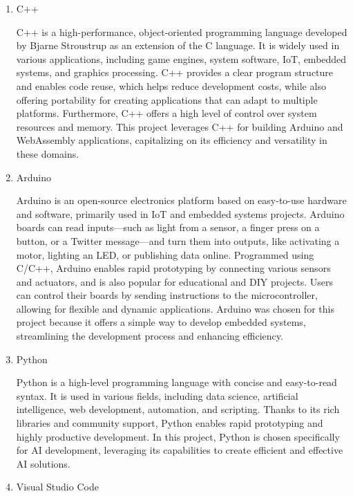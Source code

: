 \documentclass[conference]{IEEEtran}
\begin{document}
\begin{enumerate}[itemsep=2ex, parsep=1ex]
	\item C++
	      	      
	      	      
	      C++ is a high-performance, object-oriented programming language developed by Bjarne Stroustrup as an extension of the C language. It is widely used in various applications, including game engines, system software, IoT, embedded systems, and graphics processing. C++ provides a clear program structure and enables code reuse, which helps reduce development costs, while also offering portability for creating applications that can adapt to multiple platforms. Furthermore, C++ offers a high level of control over system resources and memory. This project leverages C++ for building Arduino and WebAssembly applications, capitalizing on its efficiency and versatility in these domains.
	      	      
	\item Arduino
	      	      
	      	      
	      Arduino is an open-source electronics platform based on easy-to-use hardware and software, primarily used in IoT and embedded systems projects. Arduino boards can read inputs—such as light from a sensor, a finger press on a button, or a Twitter message—and turn them into outputs, like activating a motor, lighting an LED, or publishing data online. Programmed using C/C++, Arduino enables rapid prototyping by connecting various sensors and actuators, and is also popular for educational and DIY projects. Users can control their boards by sending instructions to the microcontroller, allowing for flexible and dynamic applications. Arduino was chosen for this project because it offers a simple way to develop embedded systems, streamlining the development process and enhancing efficiency.
	      	      
	\item Python
	      	      
	      	      
	      Python is a high-level programming language with concise and easy-to-read syntax. It is used in various fields, including data science, artificial intelligence, web development, automation, and scripting. Thanks to its rich libraries and community support, Python enables rapid prototyping and highly productive development. In this project, Python is chosen specifically for AI development, leveraging its capabilities to create efficient and effective AI solutions.
	      	      
	\item Visual Studio Code
	      	      

\end{enumerate}
\end{document}
